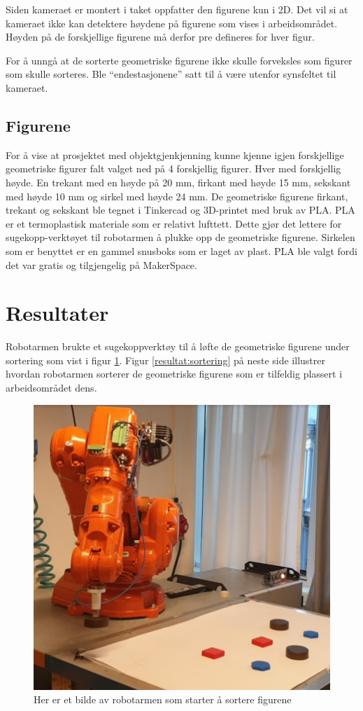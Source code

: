 \documentclass[conference]{IEEEtran}
\begin{document}

        Siden kameraet er montert i taket oppfatter den figurene kun i 2D. Det vil si at kameraet ikke kan detektere høydene på figurene som vises i arbeidsområdet. Høyden på de forskjellige figurene må derfor pre defineres for hver figur. 

        For å unngå at de sorterte geometriske figurene ikke skulle forveksles som figurer som skulle sorteres. Ble “endestasjonene” satt til å være utenfor synsfeltet til kameraet.

    \subsection{Figurene}
        For å vise at prosjektet med objektgjenkjenning kunne kjenne igjen forskjellige geometriske figurer falt valget ned på 4 forskjellig figurer. Hver med forskjellig høyde. En trekant med en høyde på 20 mm, firkant med høyde 15 mm, sekskant med høyde 10 mm og sirkel med høyde 24 mm. 
        De geometriske figurene firkant, trekant og sekskant ble tegnet i Tinkercad \cite{metode:tinkercad} og 3D-printet med bruk av PLA. PLA er et termoplastisk materiale som er relativt lufttett. Dette gjør det lettere for sugekopp-verktøyet til robotarmen å plukke opp de geometriske figurene. Sirkelen som er benyttet er en gammel snusboks som er laget av plast. PLA ble valgt fordi det var gratis og tilgjengelig på MakerSpace.

        
\section{Resultater}
    Robotarmen brukte et sugekoppverktøy til å løfte de geometriske figurene under sortering som vist i figur \ref{resultat:robotarm}. 
    Figur \ref{resultat:sortering} på neste side illustrer hvordan robotarmen sorterer de geometriske figurene som er tilfeldig plassert i arbeidsområdet dens.
    \begin{figure}[!htb]
        \centering
        \includegraphics[width=.8\linewidth]{images/robotarm1.png}
        \caption{Her er et bilde av robotarmen som starter å sortere figurene}
        \label{resultat:robotarm}
    \end{figure}
\end{document}
